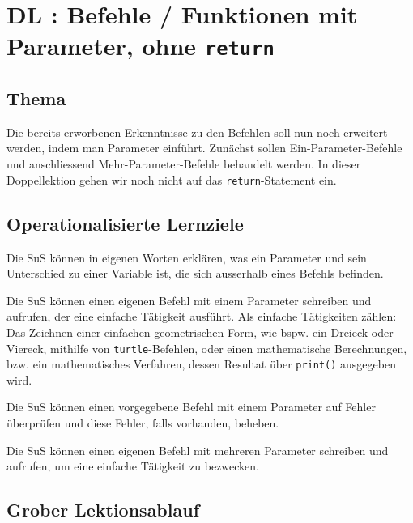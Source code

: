 \section{DL \themycounter: Befehle / Funktionen mit Parameter, ohne \texorpdfstring{\lstinline|return|}{return}}
\begin{myExBox}[title=DL \themycounter]
\subsection*{Thema}
Die bereits erworbenen Erkenntnisse zu den Befehlen soll nun noch erweitert werden, indem man Parameter einführt. Zunächst sollen Ein-Parameter-Befehle und anschliessend Mehr-Parameter-Befehle behandelt werden. In dieser Doppellektion gehen wir noch nicht auf das \lstinline|return|-Statement ein. 


\subsection*{Operationalisierte Lernziele}
\begin{todolist}
    \item Die SuS können in eigenen Worten erklären, was ein Parameter und sein Unterschied zu einer Variable ist, die sich ausserhalb eines Befehls befinden. 
    \item Die SuS können einen eigenen Befehl mit einem Parameter schreiben und aufrufen, der eine einfache Tätigkeit ausführt. Als einfache Tätigkeiten zählen: Das Zeichnen einer einfachen geometrischen Form, wie bspw. ein Dreieck oder Viereck, mithilfe von \lstinline|turtle|-Befehlen, oder einen mathematische Berechnungen, bzw. ein mathematisches Verfahren, dessen Resultat über \lstinline|print()| ausgegeben wird.
    \item Die SuS können einen vorgegebene Befehl mit einem Parameter auf Fehler überprüfen und diese Fehler, falls vorhanden, beheben. 
    \item Die SuS können einen eigenen Befehl mit mehreren Parameter schreiben und aufrufen, um eine einfache Tätigkeit zu bezwecken.  
\end{todolist}

\subsection*{Grober Lektionsablauf}

\end{myExBox}
